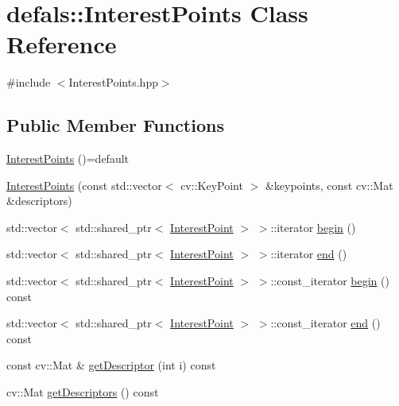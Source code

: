\hypertarget{classdefals_1_1_interest_points}{}\section{defals\+:\+:Interest\+Points Class Reference}
\label{classdefals_1_1_interest_points}


{\ttfamily \#include $<$Interest\+Points.\+hpp$>$}

\subsection*{Public Member Functions}
\begin{DoxyCompactItemize}
\item 
\hyperlink{classdefals_1_1_interest_points_a79081c5109be7071736a9676202d1290}{Interest\+Points} ()=default
\item 
\hyperlink{classdefals_1_1_interest_points_a0c1cffe13d409f76602eaec6f3f46a4b}{Interest\+Points} (const std\+::vector$<$ cv\+::\+Key\+Point $>$ \&keypoints, const cv\+::\+Mat \&descriptors)
\item 
std\+::vector$<$ std\+::shared\+\_\+ptr$<$ \hyperlink{classdefals_1_1_interest_point}{Interest\+Point} $>$ $>$\+::iterator \hyperlink{classdefals_1_1_interest_points_a4cf4e695c2abb34a11e3599a21761c21}{begin} ()
\item 
std\+::vector$<$ std\+::shared\+\_\+ptr$<$ \hyperlink{classdefals_1_1_interest_point}{Interest\+Point} $>$ $>$\+::iterator \hyperlink{classdefals_1_1_interest_points_a2eb0a72c63bfa30f454a2c90c029f369}{end} ()
\item 
std\+::vector$<$ std\+::shared\+\_\+ptr$<$ \hyperlink{classdefals_1_1_interest_point}{Interest\+Point} $>$ $>$\+::const\+\_\+iterator \hyperlink{classdefals_1_1_interest_points_afd91f2dce0f1dd0da27da44e74fb3bac}{begin} () const
\item 
std\+::vector$<$ std\+::shared\+\_\+ptr$<$ \hyperlink{classdefals_1_1_interest_point}{Interest\+Point} $>$ $>$\+::const\+\_\+iterator \hyperlink{classdefals_1_1_interest_points_affb368f5b8de93ba1b369ec9caa4222e}{end} () const
\item 
const cv\+::\+Mat \& \hyperlink{classdefals_1_1_interest_points_aafcff89fbec453aee91ff1f340a945c3}{get\+Descriptor} (int i) const
\item 
cv\+::\+Mat \hyperlink{classdefals_1_1_interest_points_a8ebee884f7378641a7f94bb137af4647}{get\+Descriptors} () const
\item 

\end{DoxyCompactItemize}

